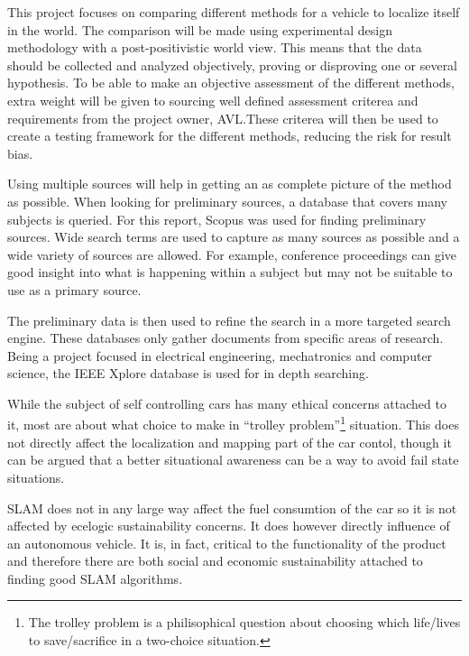 This project focuses on comparing different methods for a vehicle to localize
itself in the world. The comparison will be made using experimental design
methodology with a post-positivistic world view. This means that the data should
be collected and analyzed objectively, proving or disproving one or several
hypothesis. To be able to make an objective assessment of the different methods,
extra weight will be given to sourcing well defined assessment criterea and
requirements from the project owner, AVL.\@ These criterea will then be used to
create a testing framework for the different methods, reducing the risk for
result bias.

Using multiple sources will help in getting an as complete picture of the method
as possible. When looking for preliminary sources, a database that covers many
subjects is queried. For this report, Scopus was used for finding preliminary
sources. Wide search terms are used to capture as many sources as possible and a
wide variety of sources are allowed. For example, conference proceedings can
give good insight into what is happening within a subject but may not be
suitable to use as a primary source. 

The preliminary data is then used to refine the search in a more targeted search
engine. These databases only gather documents from specific areas of research.
Being a project focused in electrical engineering, mechatronics and computer
science, the IEEE Xplore database is used for in depth searching.  

While the subject of self controlling cars has many ethical concerns attached to
it, most are about what choice to make in ``trolley problem''\footnote{The
trolley problem is a philisophical question about choosing which life/lives to
save/sacrifice in a two-choice situation.} situation. This does not directly
affect the localization and mapping part of the car contol, though it can be
argued that a better situational awareness can be a way to avoid fail state
situations. 

SLAM does not in any large way affect the fuel consumtion of the car so it is
not affected by ecelogic sustainability concerns. It does however directly
influence of an autonomous vehicle. It is, in fact, critical to the
functionality of the product and therefore there are both social and economic
sustainability attached to finding good SLAM algorithms. 
